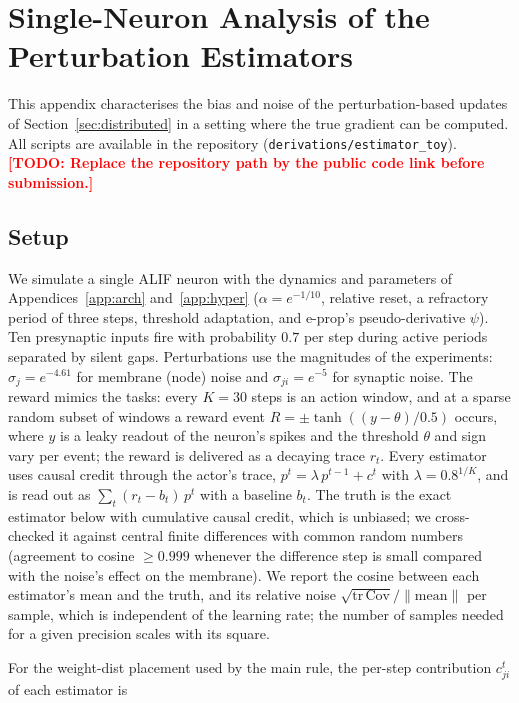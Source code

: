 \documentclass[10pt,twocolumn]{article}
\newcommand{\todo}[1]{\textcolor{red}{\bfseries[TODO: #1]}}
\begin{document}
\section{Single-Neuron Analysis of the Perturbation Estimators}
\label{app:trace}

This appendix characterises the bias and noise of the perturbation-based
updates of Section~\ref{sec:distributed} in a setting where the true gradient
can be computed. All scripts are available in the repository
(\texttt{derivations/estimator\_toy}).\todo{Replace the repository path by the
public code link before submission.}

\subsection{Setup}
\label{app:trace-setup}

We simulate a single ALIF neuron with the dynamics and parameters of
Appendices~\ref{app:arch} and~\ref{app:hyper} ($\alpha=e^{-1/10}$, relative
reset, a refractory period of three steps, threshold adaptation, and e-prop's
pseudo-derivative $\psi$). Ten presynaptic inputs fire with probability $0.7$
per step during active periods separated by silent gaps. Perturbations use the
magnitudes of the experiments: $\sigma_j=e^{-4.61}$ for membrane (node) noise
and $\sigma_{ji}=e^{-5}$ for synaptic noise. The reward mimics the tasks: every
$K=30$ steps is an action window, and at a sparse random subset of windows a
reward event $R=\pm\tanh((y-\theta)/0.5)$ occurs, where $y$ is a leaky readout of
the neuron's spikes and the threshold $\theta$ and sign vary per event; the
reward is delivered as a decaying trace $r_t$. Every estimator uses causal
credit through the actor's trace, $p^t=\lambda\,p^{t-1}+c^t$ with
$\lambda=0.8^{1/K}$, and is read out as $\sum_t (r_t-b_t)\,p^t$ with a baseline
$b_t$. The truth is the exact estimator below with cumulative causal credit,
which is unbiased; we cross-checked it against central finite differences with
common random numbers (agreement to cosine $\ge 0.999$ whenever the difference
step is small compared with the noise's effect on the membrane). We report the
cosine between each estimator's mean and the truth, and its relative noise
$\sqrt{\mathrm{tr}\,\mathrm{Cov}}/\lVert\text{mean}\rVert$ per sample, which is
independent of the learning rate; the number of samples needed for a given
precision scales with its square.

For the weight-dist placement used by the main rule, the per-step contribution
$c^t_{ji}$ of each estimator is
\end{document}
